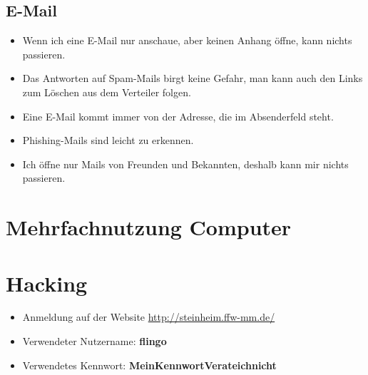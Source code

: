 \subsection{E-Mail}

\begin{frame}
\begin{itemize}
	\item Wenn ich eine E-Mail nur anschaue, aber keinen Anhang öffne, kann nichts passieren.
	\item Das Antworten auf Spam-Mails birgt keine Gefahr, man kann auch den Links zum Löschen aus dem Verteiler folgen.
	\item Eine E-Mail kommt immer von der Adresse, die im Absenderfeld steht.
	\item Phishing-Mails sind leicht zu erkennen.
	\item Ich öffne nur Mails von Freunden und Bekannten, deshalb kann mir nichts passieren.
\end{itemize}
\end{frame}

\section{Mehrfachnutzung Computer}


\section{Hacking}

\begin{frame}
\begin{itemize}
	\item Anmeldung auf der Website \href{http://steinheim.ffw-mm.de/}{http://steinheim.ffw-mm.de/}
	\item Verwendeter Nutzername: \textbf{flingo}
	\item Verwendetes Kennwort: \textbf{MeinKennwortVerateichnicht}
\end{itemize}
\end{frame}

